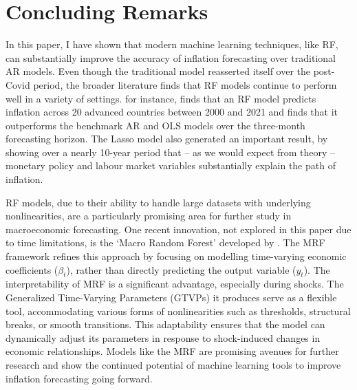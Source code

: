 \section{Concluding Remarks} \label{sec:conc}

In this paper, I have shown that modern machine learning techniques, like RF, can substantially improve the accuracy of inflation forecasting over traditional AR models. Even though the traditional model reasserted itself over the post-Covid period, the broader literature finds that RF models continue to perform well in a variety of settings. \textcite{Kohlscheen2021WhatInflation} for instance, finds that an RF model predicts inflation across 20 advanced countries between 2000 and 2021 and finds that it outperforms the benchmark AR and OLS models over the three-month forecasting horizon. The Lasso model also generated an important result, by showing over a nearly 10-year period that -- as we would expect from theory -- monetary policy and labour market variables substantially explain the path of inflation. 

RF models, due to their ability to handle large datasets with underlying nonlinearities, are a particularly promising area for further study in macroeconomic forecasting. One recent innovation, not explored in this paper due to time limitations, is the `Macro Random Forest' developed by \textcite{GouletCoulombe2024TheForest}. The MRF framework refines this approach by focusing on modelling time-varying economic coefficients ($\beta_t$), rather than directly predicting the output variable ($y_t$). The interpretability of MRF is a significant advantage, especially during shocks. The Generalized Time-Varying Parameters (GTVPs) it produces serve as a flexible tool, accommodating various forms of nonlinearities such as thresholds, structural breaks, or smooth transitions. This adaptability ensures that the model can dynamically adjust its parameters in response to shock-induced changes in economic relationships. Models like the MRF are promising avenues for further research and show the continued potential of machine learning tools to improve inflation forecasting going forward. 


